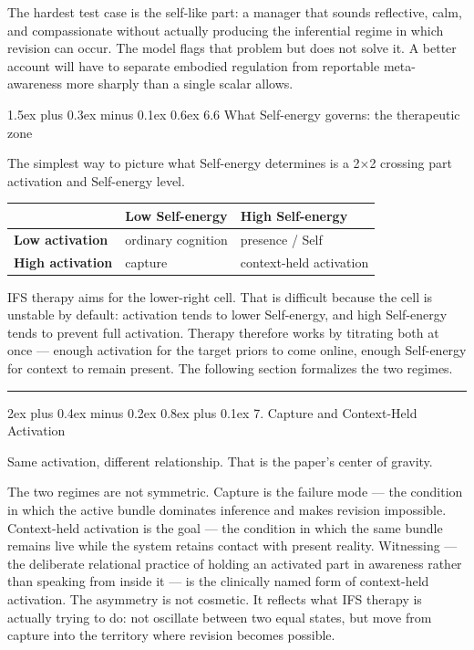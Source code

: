 \documentclass[12pt,a4paper]{article}
\makeatletter
\newcounter{none}
\renewcommand\subsection{\@startsection{subsection}{2}{0pt}%
  {2ex plus 0.4ex minus 0.2ex}%
  {0.8ex plus 0.1ex}%
  {\normalsize\itshape}}
\renewcommand\subsubsection{\@startsection{subsubsection}{3}{0pt}%
  {1.5ex plus 0.3ex minus 0.1ex}%
  {0.6ex}%
  {\normalsize\itshape}}
\makeatother
\begin{document}
The hardest test case is the self-like part: a manager that sounds
reflective, calm, and compassionate without actually producing the
inferential regime in which revision can occur. The model flags that
problem but does not solve it. A better account will have to separate
embodied regulation from reportable meta-awareness more sharply than a
single scalar allows.

\subsubsection{6.6 What Self-energy governs: the therapeutic
zone}\label{what-self-energy-governs-the-therapeutic-zone}

The simplest way to picture what Self-energy determines is a 2×2
crossing part activation and Self-energy level.

{\def\LTcaptype{none} %
\begin{longtable}[]{@{}lll@{}}
\toprule\noalign{}
& Low Self-energy & High Self-energy \\
\midrule\noalign{}
\endhead
\bottomrule\noalign{}
\endlastfoot
\textbf{Low activation} & ordinary cognition & presence / Self \\
\textbf{High activation} & capture & context-held activation \\
\end{longtable}
}

IFS therapy aims for the lower-right cell. That is difficult because the
cell is unstable by default: activation tends to lower Self-energy, and
high Self-energy tends to prevent full activation. Therapy therefore
works by titrating both at once --- enough activation for the target
priors to come online, enough Self-energy for context to remain present.
The following section formalizes the two regimes.

\begin{center}\rule{0.5\linewidth}{0.5pt}\end{center}

\subsection{7. Capture and Context-Held
Activation}\label{capture-and-context-held-activation}

Same activation, different relationship. That is the paper's center of
gravity.

The two regimes are not symmetric. Capture is the failure mode --- the
condition in which the active bundle dominates inference and makes
revision impossible. Context-held activation is the goal --- the
condition in which the same bundle remains live while the system retains
contact with present reality. Witnessing --- the deliberate relational
practice of holding an activated part in awareness rather than speaking
from inside it --- is the clinically named form of context-held
activation. The asymmetry is not cosmetic. It reflects what IFS therapy
is actually trying to do: not oscillate between two equal states, but
move from capture into the territory where revision becomes possible.
\end{document}
